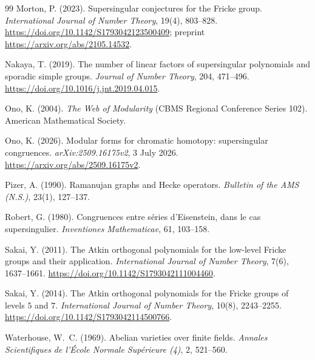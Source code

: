 \documentclass[11pt,a4paper]{article}
\numberwithin{equation}{section}
\theoremstyle{definition}
\theoremstyle{remark}
\begin{document}
\begin{thebibliography}{99}
 Morton, P. (2023). Supersingular conjectures for the
Fricke group. \emph{International Journal of Number Theory}, 19(4), 803--828.
\url{https://doi.org/10.1142/S1793042123500409}; preprint
\url{https://arxiv.org/abs/2105.14532}.

 Nakaya, T. (2019). The number of linear factors of
supersingular polynomials and sporadic simple groups. \emph{Journal of Number Theory},
204, 471--496. \url{https://doi.org/10.1016/j.jnt.2019.04.015}.

 Ono, K. (2004). \emph{The Web of Modularity} (CBMS Regional Conference Series 102).
American Mathematical Society.

 Ono, K. (2026). Modular forms for chromatic homotopy: supersingular congruences. \emph{arXiv:2509.16175v2}, 3 July 2026. \url{https://arxiv.org/abs/2509.16175v2}.

 Pizer, A. (1990). Ramanujan graphs and Hecke operators. \emph{Bulletin of the
AMS (N.S.)}, 23(1), 127--137.

 Robert, G. (1980). Congruences entre s\'eries d'Eisenstein, dans le cas supersingulier. \emph{Inventiones Mathematicae}, 61, 103--158.

 Sakai, Y. (2011). The Atkin orthogonal polynomials for
the low-level Fricke groups and their application.
\emph{International Journal of Number Theory}, 7(6), 1637--1661.
\url{https://doi.org/10.1142/S1793042111004460}.

 Sakai, Y. (2014). The Atkin orthogonal polynomials for
the Fricke groups of levels $5$ and $7$.
\emph{International Journal of Number Theory}, 10(8), 2243--2255.
\url{https://doi.org/10.1142/S1793042114500766}.

 Waterhouse, W.~C. (1969). Abelian varieties over finite fields. \emph{Annales Scientifiques de l'\'Ecole Normale Sup\'erieure (4)}, 2, 521--560.
\end{thebibliography}
\end{document}
